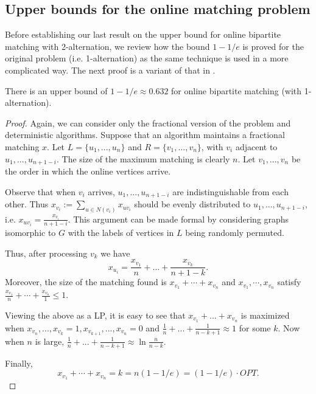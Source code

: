 \documentclass{article}
\begin{document}
\subsection{Upper bounds for the online matching problem}
Before establishing our last result on the upper bound for online bipartite matching with 2-alternation, we review how the bound $1-1/e$ is proved for the original problem (i.e. 1-alternation) as the same technique is used in a more complicated way. The next proof is a variant of that in \cite{Karp1990}.
\begin{proposition}
There is an upper bound of $1-1/e\approx 0.632$ for online bipartite matching (with 1-alternation).
\end{proposition}
\begin{proof}
Again, we can consider only the fractional version of the problem and deterministic algorithms. Suppose that an algorithm maintains a fractional matching $x$. Let $L=\{ u_1,...,u_n\}$ and $R=\{ v_1,...,v_n\}$, with $v_i$ adjacent to $u_1,...,u_{n+1-i}$. The size of the maximum matching is clearly $n$. Let $v_1,...,v_n$ be the order in which the online vertices arrive.

Observe that when $v_i$ arrives, $u_1,...,u_{n+1-i}$ are indistinguishable from each other. Thus $x_{v_i}:=\sum_{u\in N(v_i)} x_{uv_i}$ should be evenly distributed to $u_1,...,u_{n+1-i}$, i.e. $x_{uv_i}=\frac{x_{v_i}}{n+1-i}$. This argument can be made formal by considering graphs isomorphic to $G$ with the labels of vertices in $L$ being randomly permuted.

Thus, after processing $v_k$ we have $$x_{u_i}=\frac{x_{v_1}}{n}+...+\frac{x_{v_k}}{n+1-k}.$$ Moreover, the size of the matching found is $x_{v_1}+\cdots+x_{v_n}$ and $x_{v_1},\cdots,x_{v_n}$ satisfy $\frac{x_{v_1}}{n}+\cdots+\frac{x_{v_n}}{1}\leq 1$.

Viewing the above as a LP, it is easy to see that $x_{v_1}+...+x_{v_n}$ is maximized when $x_{v_n},...,x_{v_k}=1,x_{v_{k+1}},...,x_{v_n}=0$ and $\frac{1}{n}+...+\frac{1}{n-k+1}\approx 1$ for some $k$. Now when $n$ is large, $\frac{1}{n}+...+\frac{1}{n-k+1}\approx \ln\frac{n}{n-k}$.

Finally, $$x_{v_1}+\cdots+x_{v_n}=k=n(1-1/e)=(1-1/e) \cdot OPT.$$
\end{proof}
\end{document}
